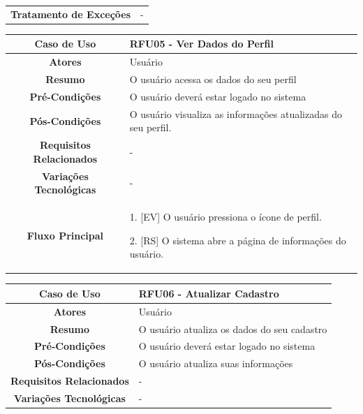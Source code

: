\begin{apendicesenv}
\begin{quadro}[htb]
\begin{tabular}{|c|p{11cm}|}
		\textbf{Tratamento de Exceções} &
		\parbox[t]{11cm}{
			\raggedright
			-
		}
		\\ \hline
	\end{tabular}
	
\end{quadro}

\begin{quadro}[htb]
	\centering
	\caption{\label{quadro_rfu05}Caso de Uso Ver Dados do Perfil (Baixo Nível)}
	\small
	\renewcommand{\arraystretch}{1.1}
	
	\begin{tabular}{|c|p{11cm}|}
		\hline
		\textbf{Caso de Uso} & RFU05 - Ver Dados do Perfil \\ \hline
		\textbf{Atores} & Usuário \\ \hline
		\textbf{Resumo} & O usuário acessa os dados do seu perfil \\ \hline
		\textbf{Pré-Condições} & O usuário deverá estar logado no sistema \\ \hline
		\textbf{Pós-Condições} & O usuário visualiza as informações atualizadas do seu perfil. \\ \hline
		\textbf{Requisitos Relacionados} & - \\ \hline
		\textbf{Variações Tecnológicas} & - \\ \hline
		
		\textbf{Fluxo Principal} &
		\parbox[t]{11cm}{
			\raggedright
			1. [EV] O usuário pressiona o ícone de perfil.\par
			2. [RS] O sistema abre a página de informações do usuário.
		}
		\\ \hline
		
		\textbf{Tratamento de Exceções} &
		\parbox[t]{11cm}{
			\raggedright
			-
		}
		\\ \hline
	\end{tabular}
	
\end{quadro}

\begin{quadro}[htb]
	\centering
	\caption{\label{quadro_rfu06}Caso de Uso Atualizar Cadastro (Baixo Nível)}
	\small
	\renewcommand{\arraystretch}{1.1}
	
	\begin{tabular}{|c|p{11cm}|}
		\hline
		\textbf{Caso de Uso} & RFU06 - Atualizar Cadastro \\ \hline
		\textbf{Atores} & Usuário \\ \hline
		\textbf{Resumo} & O usuário atualiza os dados do seu cadastro \\ \hline
		\textbf{Pré-Condições} & O usuário deverá estar logado no sistema \\ \hline
		\textbf{Pós-Condições} & O usuário atualiza suas informações \\ \hline
		\textbf{Requisitos Relacionados} & - \\ \hline
		\textbf{Variações Tecnológicas} & - \\ \hline
		

\end{tabular}
\end{quadro}
\end{apendicesenv}
